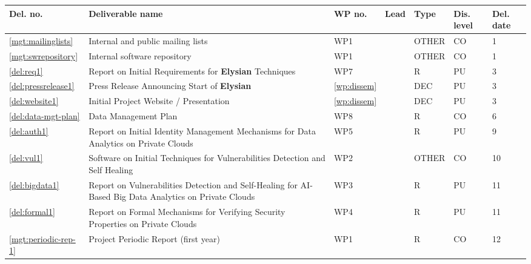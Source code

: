 \documentclass[a4paper,11pt]{article}
\newcommand{\project}[1]{\textbf{#1}\xspace}
\newcommand{\SECURITY}{\project{Elysian}}
\newcommand{\TheProject}{\SECURITY}
\begin{document}
\newpage
{}
\label{sect:deliverables}

\begin{minipage}{\textwidth}
\begin{center}
\begin{tabular}{|p{0.8cm}|p{9.65cm}|p{0.8cm}|p{1.15cm}|p{1.2cm}|p{0.8cm}|p{0.8cm}|}  \hline
\textbf{Del. no.}              & \textbf{Deliverable name}        & \textbf{WP no.} & \textbf{Lead}
& \textbf{Type}              & \textbf{Dis. level}   & \textbf{Del. date}
\\ \hline
\ref{mgt:mailinglists}           & Internal and public mailing lists
                                                                  & WP1 &\coordshort{} & OTHER & CO &  1 \\
\hline \ref{mgt:swrepository} & Internal software repository & WP1 & \coordshort{} & OTHER & CO & 1 \\
\hline \ref{del:req1} & Report on Initial Requirements for \TheProject{} Techniques & WP7 & \SOPRAshort{} & R & PU & 3 \\
\hline \ref{del:pressrelease1} & Press Release Announcing Start of \TheProject{} & \ref{wp:dissem} & \SAshort{} & DEC & PU & 3 \\
\hline \ref{del:website1} & Initial Project Website / Presentation & \ref{wp:dissem} & \UODshort{} & DEC & PU & 3 \\
\hline \ref{del:data-mgt-plan} & Data Management Plan & WP8 & \coordshort{} & R & CO & 6 \\
\hline \ref{del:auth1} & Report on Initial Identity Management Mechanisms for Data Analytics on Private Clouds & WP5 & \COGNIshort{} & R & PU & 9 \\
\hline \ref{del:vul1} & Software on Initial Techniques for Vulnerabilities Detection and Self Healing & WP2 & \YAGshort{} & OTHER & CO & 10 \\
\hline \ref{del:bigdata1} & Report on Vulnerabilities Detection and Self-Healing for AI-Based Big Data Analytics on Private Clouds & WP3 & \UODshort{} & R & PU & 11 \\
\hline \ref{del:formal1} & Report on Formal Mechanisms for Verifying Security Properties on Private Clouds & WP4 & \SCCHshort{} & R & PU & 11 \\
\hline \ref{mgt:periodic-rep-1} & Project Periodic Report (first year) & WP1 & \coordshort{} & R & CO & 12 \\

\end{tabular}
\end{center}
\end{minipage}
\end{document}
